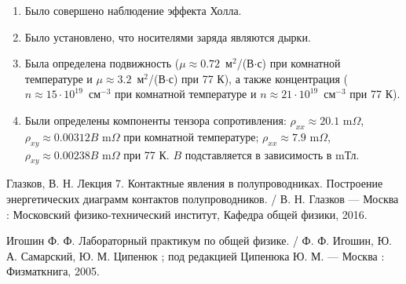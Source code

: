 \documentclass[a4paper, 12pt]{article}
\begin{document}
\begin{enumerate}
	\item Было совершено наблюдение эффекта Холла.
	
	\item Было установлено, что носителями заряда являются дырки.
	
	\item Была определена подвижность (\mbox{$\mu\approx 0.72$~м$^2$/(В$\cdot$с)} при комнатной температуре и \mbox{$\mu \approx3.2$~м$^2$/(В$\cdot$с)} при 77 К), а также концентрация ($n\approx 15 \cdot 10^{19}$~см$^{-3}$ при комнатной температуре и $n\approx 21 \cdot 10^{19}$~см$^{-3}$ при 77 К).
	
	\item Были определены компоненты тензора сопротивления: $\rho_{xx}\approx 20.1 \text{ m$\Omega$}$, $\rho_{xy}\approx0.00312B \text{ m$\Omega$}$ при комнатной температуре; $\rho_{xx}\approx 7.9 \text{ m$\Omega$}$, $\rho_{xy}\approx0.00238B \text{ m$\Omega$}$ при 77 К. $B$ подставляется в зависимость в mТл.
\end{enumerate}

\newpage

\begin{thebibliography}{2}
	Глазков, В. Н. Лекция 7. Контактные явления в полупроводниках. Построение энергетических диаграмм контактов полупроводников. / В. Н. Глазков --- Москва : Московский физико-технический институт, Кафедра общей физики, 2016.
	
	Игошин Ф. Ф. Лабораторный практикум по общей физике. / Ф. Ф. Игошин, Ю. А. Самарский, Ю. М. Ципенюк ; под редакцией Ципенюка Ю. М. --- Москва : Физматкнига, 2005.
\end{thebibliography}
\end{document}
